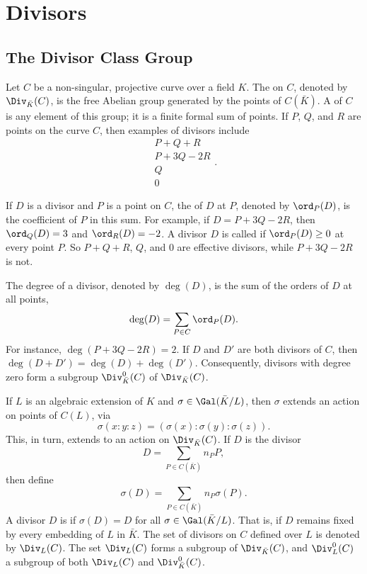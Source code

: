
\section{Divisors}
\subsection{The Divisor Class Group}

Let $C$ be a non-singular, projective curve over a field $K$.
The  on $C$, denoted by $\Div_{\bar K}(C)$, is the free Abelian group generated by the points of $C(\bar K)$.
A  of $C$ is any element of this group; it is a finite formal sum of points.
If $P$, $Q$, and $R$ are points on the curve $C$, then examples of divisors include
  \[ \begin{array}{c} P + Q + R \\ P + 3Q - 2R \\ Q \\ 0 \end{array}. \]

If $D$ is a divisor and $P$ is a point on $C$, the  of $D$ at $P$, denoted by $\ord_P(D)$, is the coefficient of $P$ in this sum.
For example, if $D = P + 3Q - 2R$, then $\ord_Q(D) = 3$ and $\ord_R(D) = -2$.
A divisor $D$ is called  if $\ord_P(D) \geq 0$ at every point $P$.
So $P + Q + R$, $Q$, and $0$ are effective divisors, while $P + 3Q - 2R$ is not.

The degree of a divisor, denoted by $\deg(D)$, is the sum of the orders of $D$ at all points,
  \[ \deg(D) = \sum_{P \in C}\ord_P(D). \]
For instance, $\deg(P + 3Q - 2R) = 2$.
If $D$ and $D'$ are both divisors of $C$, then $\deg(D + D') = \deg(D) + \deg(D')$.
Consequently, divisors with degree zero form a subgroup $\Div_{\bar K}^0(C)$ of $\Div_{\bar K}(C)$.

If $L$ is an algebraic extension of $K$ and $\sigma \in \Gal(\bar K/L)$,
then $\sigma$ extends an action on points of $C(L)$, via
  \[ \sigma(x : y : z) = (\sigma(x) : \sigma(y) : \sigma(z)). \]
This, in turn, extends to an action on $\Div_{\bar K}(C)$.
If $D$ is the divisor
  \[ D = \sum_{P \in C(\bar K)} n_P P, \]
then define
  \[ \sigma(D) = \sum_{P \in C(\bar K)} n_P \sigma(P). \]
A divisor $D$ is  if $\sigma(D) = D$ for all $\sigma \in \Gal(\bar K/L)$.
That is, if $D$ remains fixed by every embedding of $L$ in $\bar K$.
The set of divisors on $C$ defined over $L$ is denoted by $\Div_L(C)$.
The set $\Div_L(C)$ forms a subgroup of $\Div_{\bar K}(C)$, and $\Div_L^0(C)$ a subgroup of both $\Div_L(C)$ and $\Div_{\bar K}^0(C)$.

